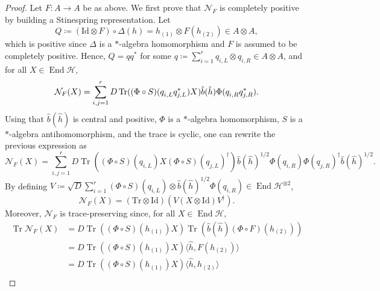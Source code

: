 \documentclass[a4paper,10pt]{amsart}
\newcommand{\Noisy}{\mathcal{N}}
\newcommand{\eval}[2]{\langle #1 , #2\rangle}
\theoremstyle{definition}
\begin{document}
\begin{proof}
	Let $F:A\to A$ be as above. We first prove that $\Noisy_F$ is completely positive by building a Stinespring representation. Let
	\begin{equation}
		Q
        \coloneqq
        (\mathrm{Id}\otimes F)\circ \Delta(h)
        =
        h_{(1)}\otimes F(h_{(2)})
        \in A\otimes A,
	\end{equation}
	which is positive since $\Delta$ is a $*$-algebra homomorphism and $F$ is assumed to be completely positive. Hence, $Q = q q^*$ for some $q \coloneqq \sum_{i=1}^r q_{i,L}\otimes q_{i,R}\in A \otimes A$, and for all $X\in\operatorname{End}\mathscr{H}$,
	\begin{equation}
		\Noisy_F(X)
		=
        \sum_{i,j=1}^r D
		\operatorname{Tr}((\Phi\circ S)(q_{\smash{i,L}}^{} q_{\smash{j,L}}^*)X)
            \hat{b}(\hat{h}) 
        \Phi(q_{\smash{i,R}}^{} q_{\smash{j,R}}^*).
	\end{equation}
	Using that $\hat{b}(\hat{h})$ is central and positive, $\Phi$ is a $*$-al\-ge\-bra ho\-mo\-mor\-phism, $S$ is a $*$-algebra an\-ti\-ho\-mo\-morphism, and the trace is cyclic, one can rewrite the previous expression as
	\begin{equation}
        \Noisy_F(X)
        =
        \sum_{i,j=1}^r
            D
        \operatorname{Tr}((\Phi\circ S)(q_{i,L})X(\Phi\circ S)(q_{j,L})^\dagger )
            \hat{b}(\hat{h})^{1/2}
            \Phi(q_{i,R})
            \Phi(q_{j,R})^\dagger
            \hat{b}(\hat{h})^{1/2}.
	\end{equation}
	By defining $V \coloneqq \sqrt{D} \sum_{i=1}^r   (\Phi\circ S)(q_{i,L}) \otimes\hat{b}(\hat{h})^{1/2} \Phi(q_{i,R}) \in\operatorname{End}\mathscr{H}^{\otimes 2}$,
	\begin{equation}
    \Noisy_F(X)
    =
    (\mathrm{Tr} \otimes \mathrm{Id})(V (X\otimes \mathrm{Id})V^\dagger).
    \end{equation}
	Moreover, $\Noisy_F$ is trace-preserving since, for all $X\in\operatorname{End}\mathscr{H}$,
	\begin{align}
		\operatorname{Tr}\Noisy_F(X)
        & =
        D \operatorname{Tr}((\Phi\circ S)(h_{(1)})X)
        \operatorname{Tr}(\hat{b}(\hat{h})(\Phi\circ F)(h_{(2)}))
		\\ &
        =
        D \operatorname{Tr}((\Phi\circ S)(h_{(1)})X)
        \eval{\hat{h}}{F(h_{(2)})}
		\\ &
        =
        D
        \operatorname{Tr}((\Phi\circ S)(h_{(1)})X)
        \eval{\hat{h}}{h_{(2)}}
		\\ &

\end{align}
\end{proof}
\end{document}
